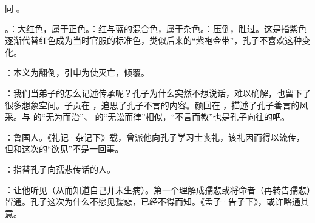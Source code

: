 {同 。}
{}


{
\begin{lyblobitemize}
\item {}。：大红色，属于正色。：红与蓝的混合色，属于杂色。：压倒，胜过。这是指紫色逐渐代替红色成为当时官服的标准色，类似后来的“紫袍金带”，孔子不喜欢这种变化。
\item {}：本义为翻倒，引申为使灭亡，倾覆。
\end{lyblobitemize}
}
{}  %


{
\item {}：我们当弟子的怎么记述传承呢？孔子为什么突然不想说话，难以确解，也留下了很多想象空间。子贡在 ，追思了孔子不言的内容。颜回在 ，描述了孔子善言的风采。与  的“无为而治”、 的“无讼而律”相似，“不言而教”也是孔子向往的吧。
}
{}


{
\item {}：鲁国人。《礼记·杂记下》载，曾派他向孔子学习士丧礼，该礼因而得以流传，但和这次的“欲见”不是一回事。
\item {}：指替孔子向孺悲传话的人。
\item {}：让他听见（从而知道自己并未生病）。第一个理解成孺悲或将命者（再转告孺悲）皆通。孔子这次为什么不愿见孺悲，已经不得而知。《孟子·告子下》，或许略通其意。%
}
{}


